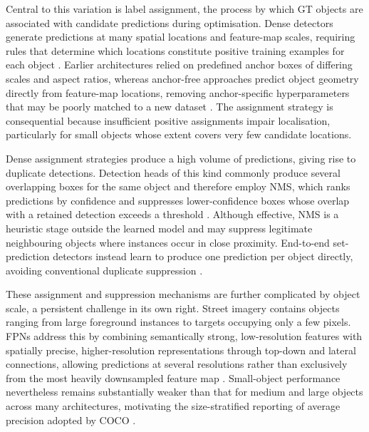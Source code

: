 Central to this variation is label assignment, the process by which \gls{GT} objects are associated with candidate predictions during optimisation. Dense detectors generate predictions at many spatial locations and feature-map scales, requiring rules that determine which locations constitute positive training examples for each object \cite{zou2023objectdetection,tian2019fcos}. Earlier architectures relied on predefined anchor boxes of differing scales and aspect ratios, whereas anchor-free approaches predict object geometry directly from feature-map locations, removing anchor-specific hyperparameters that may be poorly matched to a new dataset \cite{tian2019fcos}. The assignment strategy is consequential because insufficient positive assignments impair localisation, particularly for small objects whose extent covers very few candidate locations.

Dense assignment strategies produce a high volume of predictions, giving rise to duplicate detections. Detection heads of this kind commonly produce several overlapping boxes for the same object and therefore employ \gls{NMS}, which ranks predictions by confidence and suppresses lower-confidence boxes whose overlap with a retained detection exceeds a threshold \cite{zou2023objectdetection}. Although effective, \gls{NMS} is a heuristic stage outside the learned model and may suppress legitimate neighbouring objects where instances occur in close proximity. End-to-end set-prediction detectors instead learn to produce one prediction per object directly, avoiding conventional duplicate suppression \cite{carion2020end, wang2024yolov10}.

\noindent These assignment and suppression mechanisms are further complicated by object scale, a persistent challenge in its own right. Street imagery contains objects ranging from large foreground instances to targets occupying only a few pixels. \Glspl{FPN} address this by combining semantically strong, low-resolution features with spatially precise, higher-resolution representations through top-down and lateral connections, allowing predictions at several resolutions rather than exclusively from the most heavily downsampled feature map \cite{lin2017fpn}. Small-object performance nevertheless remains substantially weaker than that for medium and large objects across many architectures, motivating the size-stratified reporting of average precision adopted by \gls{COCO} \cite{lin2014coco,zou2023objectdetection}.

